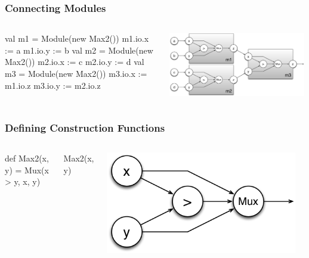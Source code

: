 \documentclass[xcolor=pdflatex,dvipsnames,table]{beamer}
\begin{document}
\begin{frame}[fragile]
\frametitle{Connecting Modules}

\begin{columns}
\begin{scala}
val m1 = 
  Module(new Max2())
m1.io.x := a
m1.io.y := b
val m2 = 
  Module(new Max2())
m2.io.x := c
m2.io.y := d
val m3 = 
  Module(new Max2())
m3.io.x := m1.io.z
m3.io.y := m2.io.z
\end{scala}


\begin{center}
\includegraphics[width=0.99\textwidth]{figs/Max4.pdf} \\
\end{center}
\end{columns}

\end{frame}


\begin{frame}[fragile]
\frametitle{Defining Construction Functions}

\begin{columns}


\begin{scala}
def Max2(x, y) = Mux(x > y, x, y)
\end{scala}
\begin{scala}
Max2(x, y)
\end{scala}


\begin{center}
\includegraphics[width=0.95\textwidth]{figs/Max2.pdf} \\[1cm]
\end{center}

\end{columns}

\end{frame}
\end{document}
